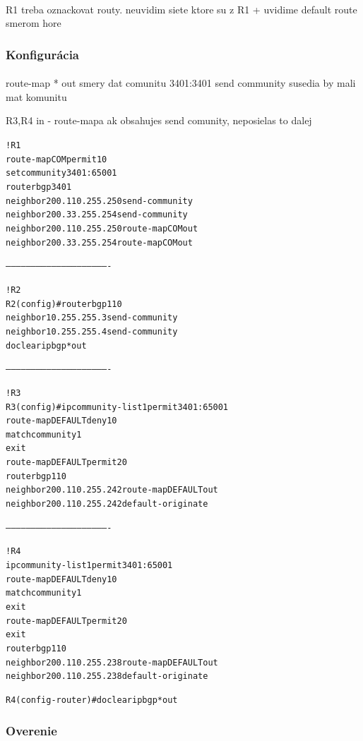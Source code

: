 \documentclass[12pt,twoside,a4paper]{report}
\begin{document}
\paragraph{}
R1 treba oznackovat routy. neuvidim siete ktore su z R1 + uvidime default route smerom hore

\subsubsection{Konfigurácia}
\paragraph{}
route-map
* out smery dat comunitu 3401:3401
send community
susedia by mali mat komunitu

R3,R4 in - route-mapa
ak obsahujes send comunity, neposielas to dalej

\noindent
{\selectfont
\begin{small}
\begin{alltt}
!R1
route-map COM permit 10
  set community 3401:65001
router bgp 3401
neighbor 200.110.255.250 send-community
neighbor 200.33.255.254 send-community
  neighbor 200.110.255.250 route-map COM out
  neighbor 200.33.255.254 route-map COM out


-------------------------------------------------------------


!R2
R2(config)#router bgp 110
  neighbor 10.255.255.3 send-community
  neighbor 10.255.255.4 send-community
do clear ip bgp * out


-------------------------------------------------------------


!R3
R3(config)#ip community-list 1 permit 3401:65001
route-map DEFAULT deny 10
  match community 1
  exit
route-map DEFAULT permit 20
router bgp 110
  neighbor 200.110.255.242 route-map DEFAULT out
  neighbor 200.110.255.242 default-originate


-------------------------------------------------------------


!R4
ip community-list 1 permit 3401:65001
route-map DEFAULT deny 10
  match community 1
  exit
route-map DEFAULT permit 20
exit
router bgp 110
  neighbor 200.110.255.238 route-map DEFAULT out
  neighbor 200.110.255.238 default-originate

R4(config-router)#do clear ip bgp * out
\end{alltt}
\end{small}
}


\subsubsection{Overenie}
\end{document}
